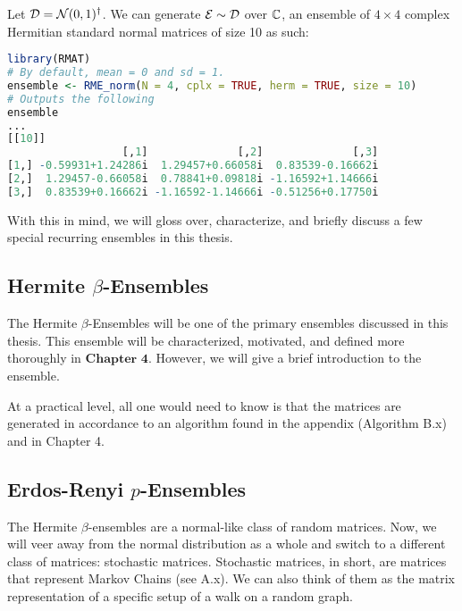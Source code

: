 \begin{code}
Let $\mathcal{D} = \mathcal{N}(0,1)^{\dagger}$. We can generate $\mathcal{E} \sim \mathcal{D}$ over $\mathbb{C}$, an ensemble of $4 \times 4$ complex Hermitian standard normal matrices of size 10 as such:
\end{code}

\begin{lstlisting}[language=R]
library(RMAT)
# By default, mean = 0 and sd = 1.
ensemble <- RME_norm(N = 4, cplx = TRUE, herm = TRUE, size = 10)
# Outputs the following
ensemble
...
[[10]]
                  [,1]              [,2]              [,3]
[1,] -0.59931+1.24286i  1.29457+0.66058i  0.83539-0.16662i
[2,]  1.29457-0.66058i  0.78841+0.09818i -1.16592+1.14666i
[3,]  0.83539+0.16662i -1.16592-1.14666i -0.51256+0.17750i
\end{lstlisting}

With this in mind, we will gloss over, characterize, and briefly discuss a few special recurring ensembles in this thesis.


\subsection{Hermite $\beta$-Ensembles}

The Hermite $\beta$-Ensembles will be one of the primary ensembles discussed in this thesis. This ensemble will be characterized, motivated, and defined more thoroughly in $\textbf{Chapter 4}$. However, we will give a brief introduction to the ensemble.

At a practical level, all one would need to know is that the matrices are generated in accordance to an algorithm found in the appendix (Algorithm B.x) and in Chapter 4.


\subsection{Erdos-Renyi $p$-Ensembles}

The Hermite $\beta$-ensembles are a normal-like class of random matrices. Now, we will veer away from the normal distribution as a whole and switch to a different class of matrices: stochastic matrices. Stochastic matrices, in short, are matrices that represent Markov Chains (see A.x). We can also think of them as the matrix representation of a specific setup of a walk on a random graph.

